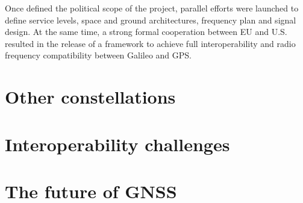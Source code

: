Once defined the political scope of the project, parallel efforts were launched
to define service levels, space and ground architectures, frequency plan and
signal design. At the same time, a strong formal cooperation between EU and U.S.
resulted in the release of a framework to achieve full interoperability and
radio frequency compatibility between Galileo and GPS.

\section{Other constellations}

\section{Interoperability challenges}

\section{The future of GNSS}
